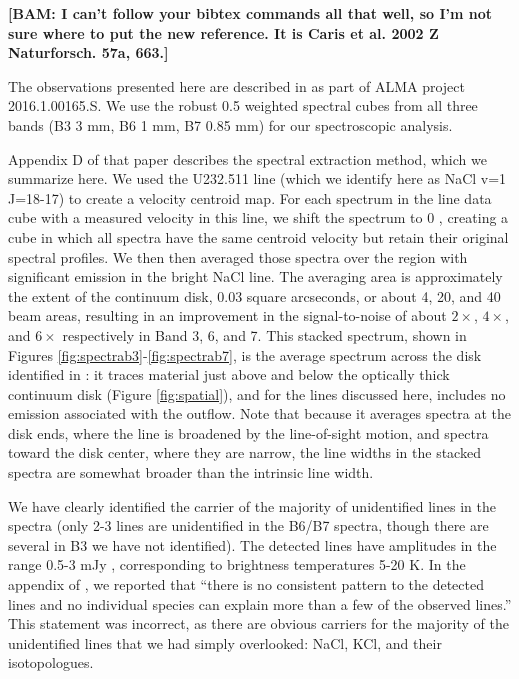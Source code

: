 \documentclass[twocolumn]{aastex62}
\newcommand{\bam}[1]{\textcolor{green!65!black}{\textbf{[BAM: #1]}}}
\begin{document}
\bam{I can't follow your bibtex commands all that well, so I'm not sure where to put the new reference.  It is Caris et al. 2002 Z Naturforsch. 57a, 663.}

The observations presented here are described in \citet{Ginsburg2018b} as part
of ALMA project 2016.1.00165.S.  We use the robust 0.5 weighted spectral cubes
from all three bands (B3 3 mm, B6 1 mm, B7 0.85 mm) for our spectroscopic analysis.

Appendix D of that paper describes the spectral extraction method,
which we summarize here.  We used the U232.511 line (which we identify here as
NaCl v=1 J=18-17) to create a velocity centroid map.  For each spectrum in the
line data cube with
a measured velocity in this line, we shift the spectrum to 0 \kms, 
creating a cube in which all spectra have the same centroid velocity but retain
their original spectral profiles.  We then then averaged those
spectra over the region with significant emission in the bright NaCl line.  The
averaging area is approximately the extent of the continuum disk, 0.03 square
arcseconds, or about 4, 20, and 40  beam areas, resulting
in an improvement in the signal-to-noise of about $2\times$, $4\times$, and $6\times$
respectively in Band 3, 6, and 7.
This stacked spectrum, shown in Figures \ref{fig:spectrab3}-\ref{fig:spectrab7},
is the average spectrum across the disk identified in \citet{Ginsburg2018b}:
it traces material just above and below the optically thick continuum disk
(Figure \ref{fig:spatial}), and for the lines discussed here, includes no
emission associated with the outflow.  Note that because it averages spectra
at the disk ends, where the line is broadened by the line-of-sight motion,
and spectra toward the disk center, where they are narrow, the line widths
in the stacked spectra are somewhat broader than the intrinsic line width.


We have clearly identified the carrier of the majority of unidentified lines in
the \citet{Ginsburg2018b} spectra (only 2-3 lines are unidentified in the B6/B7
spectra, though there are several in B3 we have not identified).  The
detected lines have amplitudes in the range 0.5-3 mJy \perbeam, corresponding
to brightness temperatures 5-20 K.  In the appendix of \citet{Ginsburg2018b}, we reported that ``there is no
consistent pattern to the detected lines and no individual species can explain
more than a few of the observed lines.''  This statement was incorrect, as
there are obvious carriers for the majority of the unidentified lines that we
had simply overlooked: NaCl, KCl, and their isotopologues.
\end{document}
